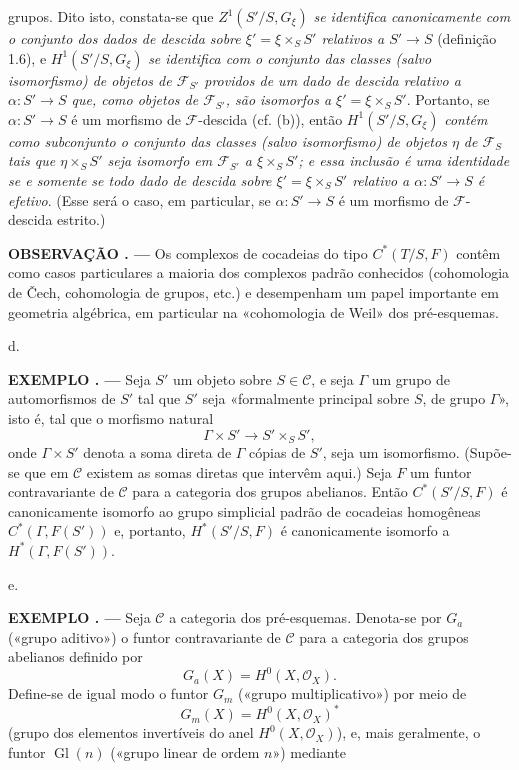 \documentclass[11pt,twoside,openany]{book}
\numberwithin{equation}{section}
\newcommand{\src}[1]{%
  \phantomsection\hypertarget{src:#1}{}%
  \marginpar{\raggedleft\footnotesize\sffamily #1}%
}
\theoremstyle{plain}
\theoremstyle{definition}
\theoremstyle{remark}
\newcommand{\result}[2]{%
  \par\medskip\noindent\textbf{#1%
  \if\relax\detokenize{#2}\relax\else\space#2\fi. ---}\enspace
}
\newcommand{\FgaUnitKey}{frontmatter}
\renewcommand{\src}[1]{%
  \phantomsection\hypertarget{src:\FgaUnitKey:#1}{}%
  \marginpar{\raggedleft\footnotesize\sffamily #1}%
}
\begin{document}
\src{312}
grupos. Dito isto, constata-se que $Z^1(S'/S,G_\xi)$ \emph{se identifica
canonicamente com o conjunto dos dados de descida sobre
$\xi'=\xi\times_SS'$ relativos a $S'\longrightarrow S$} (definição 1.6), e
$H^1(S'/S,G_\xi)$ \emph{se identifica com o conjunto das classes (salvo
isomorfismo) de objetos de $\mathcal F_{S'}$ providos de um dado de descida
relativo a $\alpha:S'\longrightarrow S$ que, como objetos de
$\mathcal F_{S'}$, são isomorfos a $\xi'=\xi\times_SS'$}. Portanto, se
$\alpha:S'\longrightarrow S$ é um morfismo de $\mathcal F$-descida
(cf. (b)), então $H^1(S'/S,G_\xi)$ \emph{contém como subconjunto o
conjunto das classes (salvo isomorfismo) de objetos $\eta$ de
$\mathcal F_S$ tais que $\eta\times_SS'$ seja isomorfo em
$\mathcal F_{S'}$ a $\xi\times_SS'$; e essa inclusão é uma identidade se e
somente se todo dado de descida sobre $\xi'=\xi\times_SS'$ relativo a
$\alpha:S'\longrightarrow S$ é efetivo}. (Esse será o caso, em particular,
se $\alpha:S'\longrightarrow S$ é um morfismo de $\mathcal F$-descida
estrito.)

\result{OBSERVAÇÃO}{} Os complexos de cocadeias do tipo $C^*(T/S,F)$
contêm como casos particulares a maioria dos complexos padrão
conhecidos (cohomologia de Čech, cohomologia de grupos, etc.) e desempenham um
papel importante em geometria algébrica, em particular na «cohomologia de
Weil» dos pré-esquemas.

\medskip\noindent
d. \result{EXEMPLO}{1} Seja $S'$ um objeto sobre $S\in\mathcal C$, e seja
$\Gamma$ um grupo de automorfismos de $S'$ tal que $S'$ seja «formalmente
principal sobre $S$, de grupo $\Gamma$», isto é, tal que o morfismo natural
\[
  \Gamma\times S'\longrightarrow S'\times_SS',
\]
onde $\Gamma\times S'$ denota a soma direta de $\Gamma$ cópias de $S'$, seja
um isomorfismo. (Supõe-se que em $\mathcal C$ existem as somas diretas que
intervêm aqui.) Seja $F$ um funtor contravariante de $\mathcal C$ para a
categoria dos grupos abelianos. Então $C^*(S'/S,F)$ é canonicamente
isomorfo ao grupo simplicial padrão de cocadeias homogêneas
$C^*(\Gamma,F(S'))$ e, portanto, $H^*(S'/S,F)$ é canonicamente isomorfo a
$H^*(\Gamma,F(S'))$.

\medskip\noindent
e. \result{EXEMPLO}{2} Seja $\mathcal C$ a categoria dos pré-esquemas. Denota-se
por $G_a$ («grupo aditivo») o funtor contravariante de $\mathcal C$ para a
categoria dos grupos abelianos definido por
\[
  G_a(X)=H^0(X,\mathcal O_X).
\]
Define-se de igual modo o funtor $G_m$ («grupo multiplicativo») por meio de
\[
  G_m(X)=H^0(X,\mathcal O_X)^*
\]
(grupo dos elementos invertíveis do anel $H^0(X,\mathcal O_X)$), e, mais
geralmente, o funtor $\operatorname{Gl}(n)$ («grupo linear de ordem $n$»)
mediante
\end{document}
